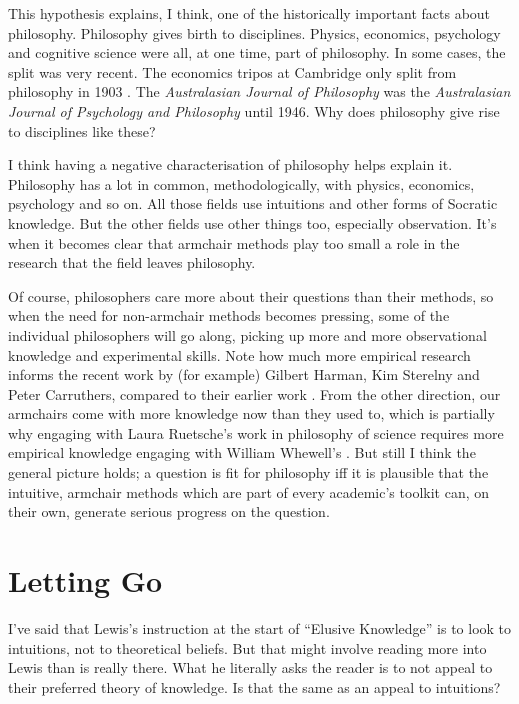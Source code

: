 This hypothesis explains, I think, one of the historically important facts about philosophy. Philosophy gives birth to disciplines. Physics, economics, psychology and cognitive science were all, at one time, part of philosophy. In some cases, the split was very recent. The economics tripos at Cambridge only split from philosophy in 1903 \citep{Tribe2002}. The \textit{Australasian Journal of Philosophy} was the \textit{Australasian Journal of Psychology and Philosophy} until 1946. Why does philosophy give rise to disciplines like these?

I think having a negative characterisation of philosophy helps explain it. Philosophy has a lot in common, methodologically, with physics, economics, psychology and so on. All those fields use intuitions and other forms of Socratic knowledge. But the other fields use other things too, especially observation. It's when it becomes clear that armchair methods play too small a role in the research that the field leaves philosophy. 

Of course, philosophers care more about their questions than their methods, so when the need for non-armchair methods becomes pressing, some of the individual philosophers will go along, picking up more and more observational knowledge and experimental skills. Note how much more empirical research informs the recent work by (for example) Gilbert Harman, Kim Sterelny and Peter Carruthers, compared to their earlier work \citep{Harman1973, Harman2011, DevittSterelny1987, Sterelny2012, Carruthers1990, Carruthers2011}. From the other direction, our armchairs come with more knowledge now than they used to, which is partially why engaging with Laura Ruetsche's work in philosophy of science requires more empirical knowledge engaging with William Whewell's \citep{Ruetsche2011, Whewell1840}. But still I think the general picture holds; a question is fit for philosophy iff it is plausible that the intuitive, armchair methods which are part of every academic's toolkit can, on their own, generate serious progress on the question.

\section{Letting Go}
\label{sec:Go}

I've said that Lewis's instruction at the start of ``Elusive Knowledge'' is to look to intuitions, not to theoretical beliefs. But that might involve reading more into Lewis than is really there. What he literally asks the reader is to not appeal to their preferred theory of knowledge. Is that the same as an appeal to intuitions?

